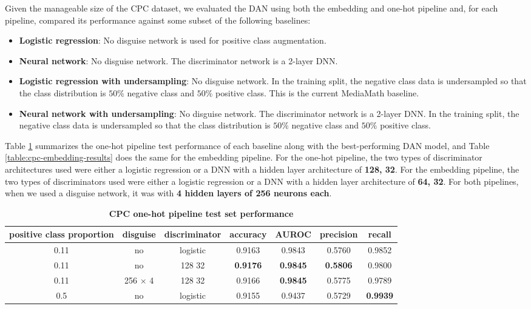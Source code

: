 \documentclass{proc}
\begin{document}
Given the manageable size of the CPC dataset, we evaluated the DAN using both the embedding and one-hot pipeline and, for each pipeline, compared its performance against some subset of the following baselines:

\begin{itemize}
    \item{\textbf{Logistic regression}}: No disguise network is used for positive class augmentation.
    \item{\textbf{Neural network}}: No disguise network. The discriminator network is a 2-layer DNN.
    \item{\textbf{Logistic regression with undersampling}}: No disguise network. In the training split, the negative class data is undersampled so that the class distribution is $50\%$ negative class and $50\%$ positive class. This is the current MediaMath baseline.
    \item{\textbf{Neural network with undersampling}}: No disguise network. The discriminator network is a 2-layer DNN. In the training split, the negative class data is undersampled so that the class distribution is $50\%$ negative class and $50\%$ positive class.
\end{itemize}

Table \ref{table:cpc-onehot-results} summarizes the one-hot pipeline test performance of each baseline along with the best-performing DAN model, and Table \ref{table:cpc-embedding-results} does the same for the embedding pipeline. For the one-hot pipeline, the two types of discriminator architectures used were either a logistic regression or a DNN with a hidden layer architecture of \textbf{128, 32}. For the embedding pipeline, the two types of discriminators used were either a logistic regression or a DNN with a hidden layer architecture of \textbf{64, 32}. For both pipelines, when we used a disguise network, it was with \textbf{4 hidden layers of 256 neurons each}.

\begin{table}[]
\begin{center}
	\begin{tabular}{|c|c|c|c|c|c|c|}
		\hline
 		\textbf{positive class proportion} &  \textbf{disguise} & \textbf{discriminator} & \textbf{accuracy} & \textbf{AUROC} & \textbf{precision} & \textbf{recall} \\ \hline
 		0.11 & no & logistic & 0.9163 & 0.9843 & 0.5760 & 0.9852 \\ \hline
 		0.11 & no & 128 32 & \textbf{0.9176} & \textbf{0.9845} & \textbf{0.5806} & 0.9800 \\ \hline
 		0.11 & 256 $\times$ 4 & 128 32 & 0.9166 & \textbf{0.9845} & 0.5775 & 0.9789 \\ \hline
 		0.5 & no & logistic & 0.9155 & 0.9437 & 0.5729 & \textbf{0.9939} \\ \hline
	\end{tabular}
	\caption{\textbf{CPC one-hot pipeline test set performance}}
	\label{table:cpc-onehot-results}
\end{center}
\end{table}
\end{document}
